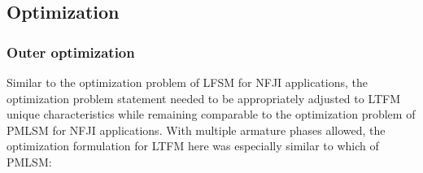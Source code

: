         
        
        \subsection{Optimization}                   \label{Chapter:RSM/LTFM/Optimization}
        
        
            \subsubsection{Outer optimization}         \label{Chapter:RSM/LTFM/Optimization/Outer}
    
            
                Similar to the optimization problem of \acs{LFSM} for \acs{NFJI} applications, the optimization problem statement needed to be appropriately adjusted to \acs{LTFM} unique characteristics while remaining comparable to the optimization problem of \acs{PMLSM} for \acs{NFJI} applications. With multiple armature phases allowed, the optimization formulation for \acs{LTFM} here was especially similar to which of \acs{PMLSM}:
                
